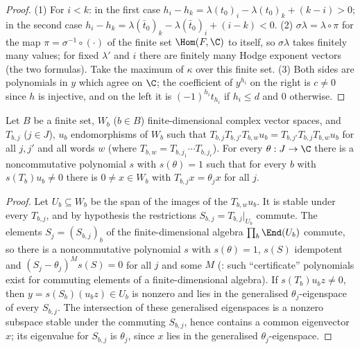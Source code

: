 \begin{proof}
(1) For $i<k$: in the first case $h_i-h_k=\lambda(t_0)_i-\lambda(t_0)_k+(k-i)>0$; in the second case $h_i-h_k=\lambda(\bar t_0)_k-\lambda(\bar t_0)_i+(i-k)<0$.
(2) $\sigma\lambda=\lambda\circ\pi$ for the map $\pi=\sigma^{-1}\circ(\cdot)$ of the finite set $\Hom(F,\C)$ to itself, so $\sigma\lambda$ takes finitely many
values; for fixed $\lambda'$ and $i$ there are finitely many Hodge exponent vectors (the two formulas). Take the maximum of $\kappa$ over this finite
set. (3) Both sides are polynomials in $y$ which agree on $\C$; the coefficient of $y^{h_i}$ on the right is $c\neq0$ since $h$ is injective, and on the
left it is $(-1)^{h_i}t_{h_i}$ if $h_i\le d$ and $0$ otherwise.
\end{proof}

\begin{lemma}\label{pf:ks1:lem-eigof}
Let $B$ be a finite set, $W_b$ ($b\in B$) finite-dimensional complex vector spaces, and $T_{b,j}$ ($j\in J$), $u_b$ endomorphisms of $W_b$ such that
$T_{b,j}T_{b,j'}T_{b,w}u_b=T_{b,j'}T_{b,j}T_{b,w}u_b$ for all $j,j'$ and all words $w$ (where $T_{b,w}=T_{b,j_1}\cdots T_{b,j_r}$). For every
$\theta:J\to\C$ there is a noncommutative polynomial $s$ with $s(\theta)=1$ such that for every $b$ with $s(T_b)u_b\neq0$ there is $0\neq x\in W_b$
with $T_{b,j}x=\theta_jx$ for all $j$.
\end{lemma}

\begin{proof}
Let $U_b\subseteq W_b$ be the span of the images of the $T_{b,w}u_b$. It is stable under every $T_{b,j}$, and by hypothesis the restrictions
$S_{b,j}=T_{b,j}|_{U_b}$ commute. The elements $S_j=(S_{b,j})_b$ of the finite-dimensional algebra $\prod_b\End(U_b)$ commute, so there is a
noncommutative polynomial $s$ with $s(\theta)=1$, $s(S)$ idempotent and $(S_j-\theta_j)^Ms(S)=0$ for all $j$ and some $M$
(: such ``certificate'' polynomials exist for commuting elements of a finite-dimensional
algebra). If $s(T_b)u_bz\neq0$, then $y=s(S_b)(u_bz)\in U_b$ is nonzero and lies in the generalised $\theta_j$-eigenspace of every $S_{b,j}$. The
intersection of these generalised eigenspaces is a nonzero subspace stable under the commuting $S_{b,j}$, hence contains a common eigenvector $x$; its
eigenvalue for $S_{b,j}$ is $\theta_j$, since $x$ lies in the generalised $\theta_j$-eigenspace.
\end{proof}

